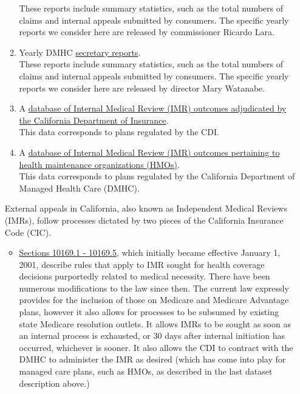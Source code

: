 \documentclass[12pt, a4paper,twoside,parskip=full]{report}
\theoremstyle{plain} %
\theoremstyle{definition} %
\theoremstyle{remark} %
\numberwithin{equation}{chapter}
\begin{document}
\begin{itemize}
\begin{tcolorbox}
\begin{enumerate}
				These reports include summary statistics, such as the total numbers of claims and internal appeals submitted by consumers. The specific yearly reports we consider here are released by commissioner Ricardo Lara. 
				
				\item Yearly DMHC \href{https://dmhc.ca.gov/AbouttheDMHC/DMHCReports/AnnualReports.aspx}{secretary reports}.\\
				
				These reports include summary statistics, such as the total numbers of claims and internal appeals submitted by consumers. The specific yearly reports we consider here are released by director Mary Watanabe.
				
				\item A \href{https://interactive.web.insurance.ca.gov/apex_extprd/f?p=192:1:5191948876739:::::}{database of Internal Medical Review (IMR) outcomes adjudicated by the California Department of Insurance}.\\
			
				This data corresponds to plans regulated by the CDI.
				
				\item A \href{https://data.chhs.ca.gov/dataset/independent-medical-review-imr-determinations-trend}{database of Internal Medical Review (IMR) outcomes pertaining to health maintenance organizations (HMOs)}.\\
				
				This data corresponds to plans regulated by the California Department of Managed Health Care (DMHC).
				
			\end{enumerate}
			
			External appeals in California, also known as Independent Medical Reviews (IMRs), follow processes dictated by two pieces of the California Insurance Code (CIC).
			
			\begin{itemize}
				
				
				\item \href{https://leginfo.legislature.ca.gov/faces/codes_displayText.xhtml?lawCode=INS&division=2.&title=&part=2.&chapter=1.&article=3.5.}{Sections 10169.1 - 10169.5}, which initially became effective January 1, 2001, describe rules that apply to IMR sought for health coverage decisions purportedly related to medical necessity. There have been numerous modifications to the law since then. The current law expressly provides for the inclusion of those on Medicare and Medicare Advantage plans, however it also allows for processes to be subsumed by existing state Medicare resolution outlets. It allows IMRs to be sought as soon as an internal process is exhausted, or 30 days after internal initiation has occurred, whichever is sooner. It also allows the CDI to contract with the DMHC to administer the IMR as desired (which has come into play for managed care plans, such as HMOs, as described in the last dataset description above.)\\
				

\end{itemize}
\end{tcolorbox}
\end{itemize}
\end{document}
